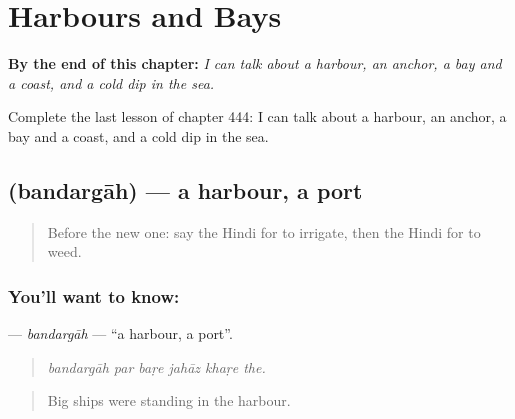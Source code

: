 
\chapter{Harbours and Bays}
\label{ch:hi-harbours-and-bays}

\begin{chapteropening}
\textbf{By the end of this chapter:} \emph{I can talk about a harbour, an anchor, a bay and a coast, and a cold dip in the sea.}

Complete the last lesson of chapter 444: I can talk about a harbour, an anchor, a bay and a coast, and a cold dip in the sea.
\end{chapteropening}

\section[\texorpdfstring{\hi{बंदरगाह} (bandargāh)}{बंदरगाह (bandargāh)}]{ (bandargāh) — a harbour, a port}

\label{lesson:HI-C444-bandargah}



\begin{quote}
Before the new one: say the Hindi for to irrigate, then the Hindi for to weed.
\end{quote}

\subsection*{You'll want to know: }
\textbf{} — \emph{bandargāh} — \textquotedblleft{}a harbour, a port\textquotedblright{}.

\begin{quote}
     
\end{quote}

\begin{quote}
\emph{bandargāh par baṛe jahāz khaṛe the.}
\end{quote}

\begin{quote}
Big ships were standing in the harbour.
\end{quote}

